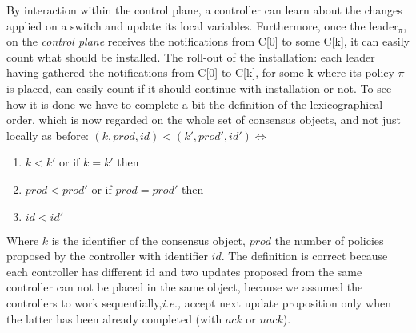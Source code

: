 \documentclass{article}
\theoremstyle{remark}
\begin{document}
 By interaction within the control plane, a controller can learn about the changes applied on a switch and update its local variables. Furthermore, once the leader$_\pi$, on the \emph{control plane} receives the notifications from C[0] to some C[k], it can easily count what should be installed.%
  The roll-out of the installation: each leader having gathered the notifications from C[0] to C[k], for some k where its policy $\pi$ is placed, can easily count if it should continue with installation or not.
To see how it is done we have to complete a bit the definition of the lexicographical order, which is now regarded on the whole set of consensus objects, and not just locally as before:
$(k,prod,id)<(k',prod',id') \Leftrightarrow $
\begin{enumerate}
\item $k<k'$ or if $k=k'$ then 
\item $prod<prod'$ or if $prod=prod'$ then
\item $id<id'$
\end{enumerate}
Where $k$ is the identifier of the consensus object, $prod$ the number of policies proposed by the controller with identifier $id$. The definition is correct because each controller has different id and two updates proposed from the same controller can not be placed in the same object, because we assumed the controllers to work sequentially,\emph{i.e.,} accept next update proposition only when the latter has been already completed (with $ack$ or $nack$).
%
\end{document}
